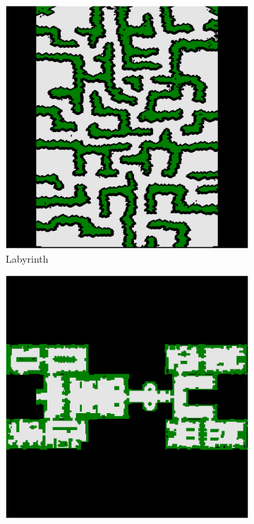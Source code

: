\documentclass[11pt]{article}
\begin{document}
    \begin{figure}
        \centering
        \begin{subfigure}[b]{0.24\textwidth}
            \centering
            \includegraphics[width=\textwidth]{../maps/Labyrinth}
            \caption{Labyrinth}
            \label{fig:y equals x}
        \end{subfigure}
        \hfill
        \begin{subfigure}[b]{0.24\textwidth}
            \centering
            \includegraphics[width=\textwidth]{../maps/den401d}

\end{subfigure}
\end{figure}
\end{document}
